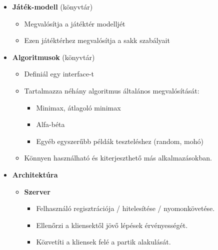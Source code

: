 \documentclass[twoside, a4paper, 12pt]{article}
\begin{document}
\begin{itemize}
	
	\item \textbf{Játék-modell} (könyvtár)
	\begin{itemize}
		\item Megvalósítja a játéktér modelljét
		\item Ezen játéktérhez megvalósítja a sakk szabályait
	\end{itemize}
	
	\item \textbf{Algoritmusok} (könyvtár)
	\begin{itemize}
		\item Definiál egy interface-t
		\item Tartalmazza néhány algoritmus általános megvalósítását:
		\begin{itemize}
			\item Minimax, átlagoló minimax
			\item Alfa-béta
			\item Egyéb egyszerűbb példák teszteléshez (random, mohó)
		\end{itemize}
		\item Könnyen használható és kiterjeszthető más alkalmazásokban.
	\end{itemize}
	
	\item \textbf{Architektúra}
	\begin{itemize}
		\item \textbf{Szerver}
		\begin{itemize}
			\item Felhasználó regisztrációja / hitelesítése / nyomonkövetése.
			\item Ellenőrzi a kliensektől jövő lépések érvényességét.
			\item Közvetíti a kliensek felé a partik alakulását.
		\end{itemize}
		

\end{itemize}
\end{itemize}
\end{document}
